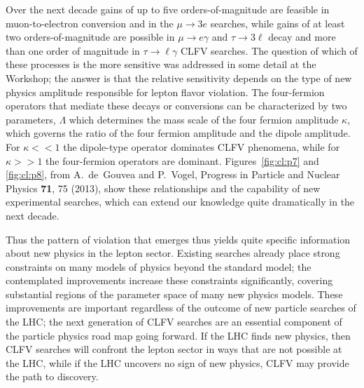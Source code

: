 \documentclass{tcibook}
\begin{document}
Over the next decade
gains of up to five orders-of-magnitude are feasible in
muon-to-electron conversion and in the $\mu \to 3 e$
searches, while gains of at least two orders-of-magnitude
are possible in $\mu \to e\gamma$ and $\tau \to 3\ell$ decay and more than one order of magnitude in $\tau \to \ell\gamma$ CLFV
searches.  The question of which of these processes is the more sensitive was addressed in some detail at the Workshop; the answer is that the relative sensitivity depends on the type of new physics amplitude responsible for lepton flavor violation. 
The four-fermion operators that mediate these decays or conversions can be characterized by two parameters, $\Lambda$ which determines the mass scale of the four fermion amplitude $\kappa$, which governs the ratio of the four fermion amplitude and the dipole amplitude. 
For $\kappa << 1$ the dipole-type operator dominates CLFV phenomena, while for $\kappa >> 1$ the four-fermion
operators are dominant. Figures~\ref{fig:cl:p7} and \ref{fig:cl:p8}, from A.~de~Gouvea and P.~Vogel, Progress in Particle and Nuclear Physics
{\bf 71},  75 (2013), show these relationships and the capability of new experimental searches, which can extend our knowledge quite dramatically in the next decade.


Thus the pattern of violation that emerges thus yields quite specific information about new physics in the lepton sector. Existing searches already place strong constraints on
many models of physics beyond the standard model; the contemplated improvements increase these constraints significantly, covering substantial regions of the parameter space of many new physics models.
These improvements are important regardless of the outcome of new particle searches of the
LHC; the next generation of CLFV searches are an essential
component of the particle physics road map going forward.  If the LHC finds new
physics, then CLFV searches will confront the lepton sector in ways
that are not possible at the LHC, while if the LHC uncovers no sign of
new physics, CLFV may provide the path to discovery.
\end{document}
